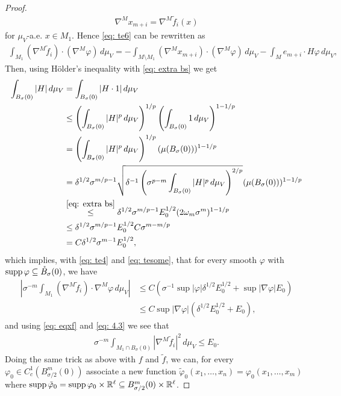 \begin{proof}
\begin{align}
    \nabla^M x_{m+i} = \nabla^M \tilde f_i(x)\label{eq: eqxf}
\end{align}
for $\mu_V$-a.e. $x \in M_1$. Hence \eqref{eq: te6} can be rewritten as
\begin{align}
    \int_{M_1} (\nabla^M \tilde f_i) \cdot (\nabla^M \varphi)\, d\mu_V = - \int_{M\setminus M_1} (\nabla^M x_{m+i}) \cdot (\nabla^M \varphi)\, d\mu_V - \int_M e_{m+i}\cdot H\varphi\, d\mu_V, \label{eq: tesome}
\end{align}
Then, using Hölder's inequality with \eqref{eq: extra bs} we get
\begin{align*}
    \int_{B_{\sigma}(0)} |H|\, d\mu_V &= \int_{B_{\sigma}(0)} |H\cdot 1|\, d\mu_V \\
    &\le \left(\int_{B_{\sigma}(0)} |H|^p\, d\mu_V\right)^{1/p}\left(\int_{B_{\sigma}(0)} 1\, d\mu_V\right)^{1-1/p} \\
    &= \left(\int_{B_{\sigma}(0)} |H|^p\, d\mu_V\right)^{1/p}(\mu(B_{\sigma}(0)))^{1-1/p} \\
    &= \delta^{1/2}\sigma^{m/p-1}\sqrt{\delta^{-1}\left(\sigma^{p-m} \int_{B_{\sigma}(0)}|H|^p\,d\mu_V \right)^{2/p} } (\mu(B_{\sigma}(0)))^{1-1/p} \\
    &\overset{\eqref{eq: extra bs}}{\le} \delta^{1/2}\sigma^{m/p-1}E_0^{1/2} (2\omega_m \sigma^m)^{1-1/p} \\
    &\le \delta^{1/2}\sigma^{m/p-1}E_0^{1/2} C \sigma^{m-m/p} \\
    &= C\delta^{1/2}\sigma^{m-1}E_0^{1/2}, \\
\end{align*}
which implies, with \eqref{eq: te4} and \eqref{eq: tesome}, that for every smooth $\varphi$ with $\operatorname{supp} \varphi \subseteq \mathring{B}_{\sigma}(0)$, we have
\begin{align}
    \left| \sigma^{-m} \int_{M_1} (\nabla^M \tilde f_i)\cdot \nabla^M \varphi \, d\mu_V \right| &\le C(\sigma^{-1}\sup|\varphi| \delta^{1/2}E_0^{1/2} + \sup|\nabla \varphi| E_0) \nonumber \\
    &\le C\sup|\nabla \varphi| (\delta^{1/2}E_0^{1/2} + E_0),\label{eq: te8}
\end{align}
and using \eqref{eq: eqxf} and \eqref{eq: 4.3} we see that
\begin{align}
    \sigma^{-m} \int_{M_1 \cap B_{\sigma}(0)} |\nabla^M \tilde f_i|^2\, d\mu_V \le E_0.\label{eq: te9}
\end{align}
Doing the same trick as above with $f$ and $\tilde f$, we can, for every $\varphi_0 \in C_c^1(B_{\sigma/2}^m(0))$ associate a new function $\tilde \varphi_0(x_1, \dots, x_n)=\varphi_0(x_1, \dots, x_m)$ where $\operatorname{supp} \tilde \varphi_0 = \operatorname{supp} \varphi_0 \times \mathbb{R}^{\ell} \subseteq B_{\sigma/2}^m(0) \times \mathbb{R}^{\ell}$.

\end{proof}
